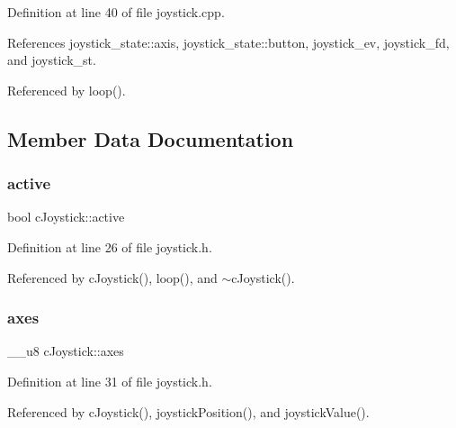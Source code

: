 Definition at line 40 of file joystick.\+cpp.



References joystick\+\_\+state\+::axis, joystick\+\_\+state\+::button, joystick\+\_\+ev, joystick\+\_\+fd, and joystick\+\_\+st.



Referenced by loop().



\subsection{Member Data Documentation}
\mbox{\label{classc_joystick_a76b927cfdc179f053256952d0d94656d}} 
\subsubsection{\texorpdfstring{active}{active}}
{\footnotesize\ttfamily bool c\+Joystick\+::active\hspace{0.3cm}{\ttfamily [private]}}



Definition at line 26 of file joystick.\+h.



Referenced by c\+Joystick(), loop(), and $\sim$c\+Joystick().

\mbox{\label{classc_joystick_ada53890948b0afe1b49b4c2ff2970c77}} 
\subsubsection{\texorpdfstring{axes}{axes}}
{\footnotesize\ttfamily \+\_\+\+\_\+u8 c\+Joystick\+::axes\hspace{0.3cm}{\ttfamily [private]}}



Definition at line 31 of file joystick.\+h.



Referenced by c\+Joystick(), joystick\+Position(), and joystick\+Value().

\mbox{\label{classc_joystick_ae493e39825c273556d4807cb31d047e0}} 
